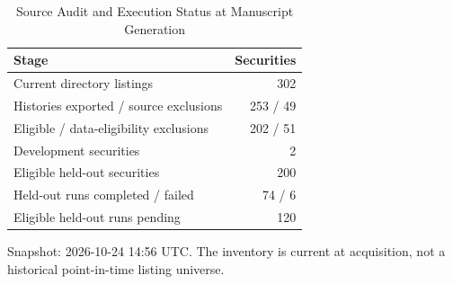 \begin{table}[!t]
\caption{Source Audit and Execution Status at Manuscript Generation}
\label{tab:inclusion}
\centering\footnotesize
\setlength{\tabcolsep}{2.7pt}
\begin{tabular}{@{}lr@{}}
\toprule
Stage & Securities \\
\midrule
Current directory listings & 302 \\
Histories exported / source exclusions & 253 / 49 \\
Eligible / data-eligibility exclusions & 202 / 51 \\
Development securities & 2 \\
Eligible held-out securities & 200 \\
Held-out runs completed / failed & 74 / 6 \\
Eligible held-out runs pending & 120 \\
\bottomrule
\end{tabular}
\parbox{\columnwidth}{\scriptsize Snapshot: 2026-10-24 14:56 UTC. The inventory is current at acquisition, not a historical point-in-time listing universe.}
\end{table}